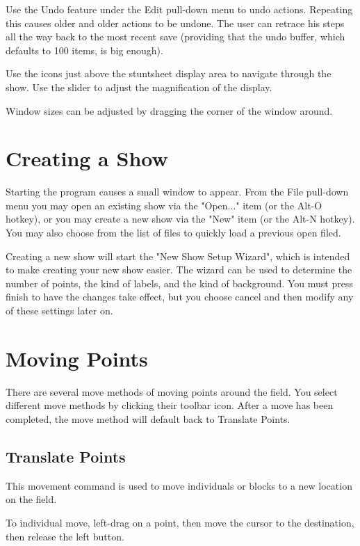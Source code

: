 Use the Undo feature under the Edit pull-down menu to undo actions.
Repeating this causes older and older actions to be undone.  The user
can retrace his steps all the way back to the most recent save
(providing that the undo buffer, which defaults to 100 items, is big enough).

Use the icons just above the stuntsheet display area to navigate through
the show.  Use the slider to adjust the magnification of the display.

Window sizes can be adjusted by dragging the corner of the window
around.

\section{Creating a Show}\label{newshow}

Starting the program causes a small window to appear.  From the File pull-down
menu you may open an existing show via the "Open..." item (or the Alt-O hotkey),
or you may create a new show via the "New" item (or the Alt-N hotkey).  You may 
also choose from the list of files to quickly load a previous open filed.

Creating a new show will start the "New Show Setup Wizard", which is intended
to make creating your new show easier.  The wizard can be used to determine the
number of points, the kind of labels, and the kind of background.  You must
press finish to have the changes take effect, but you choose cancel and 
then modify any of these settings later on.

\section{Moving Points}\label{movement}

There are several move methods of moving points around the field.  You select
different move methods by clicking their toolbar icon.  After a move has been
completed, the move method will default back to Translate Points.

\subsection{Translate Points}\label{translatepoints}

This movement command is used to move individuals or blocks to a new location
on the field.

To individual move, left-drag on a point, then move the cursor
to the destination, then release the left button.

